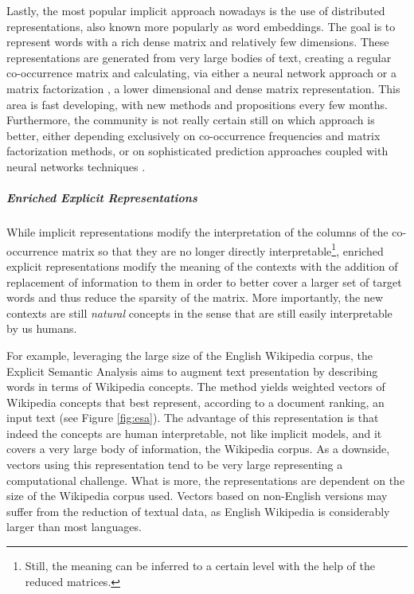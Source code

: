 Lastly, the most popular implicit approach nowadays is the use of distributed representations, also known more popularly as word embeddings. The goal is to represent words with a rich dense matrix and relatively few dimensions. These representations are generated from very large bodies of text, creating a regular co-occurrence matrix and calculating, via either a neural network approach \cite{bengio2003neural,Collobert2011,mikolov2013distributed} or a matrix factorization \cite{pennington2014glove,levy2014neural},  a lower dimensional and dense matrix representation. This area is fast developing, with new methods and propositions every few months. Furthermore, the community is not really certain still on which approach is better, either depending exclusively on co-occurrence frequencies and matrix factorization methods, or on sophisticated prediction approaches coupled with neural networks techniques \cite{baroni2014don,levy2015improving}.



\subparagraph{Enriched Explicit Representations}
While implicit representations modify the interpretation of the columns of the co-occurrence matrix so that they are no longer directly interpretable\footnote{Still, the meaning can be inferred to a certain level with the help of the reduced matrices.},  enriched explicit representations modify the meaning of the contexts with the addition of replacement of information to them in order to better cover a larger set of target words and thus reduce the sparsity of the matrix. More importantly, the new contexts are still \textit{natural} concepts in the sense that are still easily interpretable by us humans.




For example, leveraging the large size of the English Wikipedia corpus, the Explicit Semantic Analysis \cite{gabrilovich2007computing} aims to augment text presentation by describing words in terms of Wikipedia concepts. The method yields weighted vectors of Wikipedia concepts that best represent, according to a document ranking, an input text (see Figure \ref{fig:esa}).  The advantage of this representation is that indeed the concepts are human interpretable, not like implicit models, and it covers a very large body of information,  the Wikipedia corpus. As a downside, vectors using this representation tend to be very large representing a computational challenge. What is more, the representations are dependent on the size of the Wikipedia corpus used. Vectors based on non-English versions may suffer from the reduction of textual data, as English Wikipedia is considerably larger than most languages.

